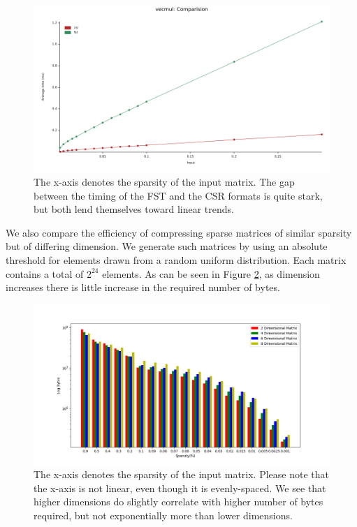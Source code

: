 \documentclass[12pt]{article}
\begin{document}
\begin{center}
\begin{figure}
  \includegraphics[width=\textwidth]{vecmul}
  \caption{The x-axis denotes the sparsity of the input matrix. The gap between the timing of the FST and the CSR formats is
  quite stark, but both lend themselves toward linear trends.}
  \label{fig:vecmul}
\end{figure}
\end{center}

We also compare the efficiency of compressing sparse matrices of similar sparsity but of
differing dimension. We generate such matrices by using an absolute threshold for elements drawn
from a random uniform distribution. Each matrix contains a total of $2^{24}$ elements. As can be
seen in Figure \ref{fig:dims}, as dimension increases there is little increase in the required number of
bytes.

\begin{center}
\begin{figure}
  \includegraphics[width=\textwidth]{dims}
  \caption{The x-axis denotes the sparsity of the input matrix. Please note that the x-axis is
  not linear, even though it is evenly-spaced. We see that higher dimensions do   slightly correlate
  with higher number of bytes required, but not exponentially more than lower dimensions.}
  \label{fig:dims}
\end{figure}
\end{center}
\end{document}
